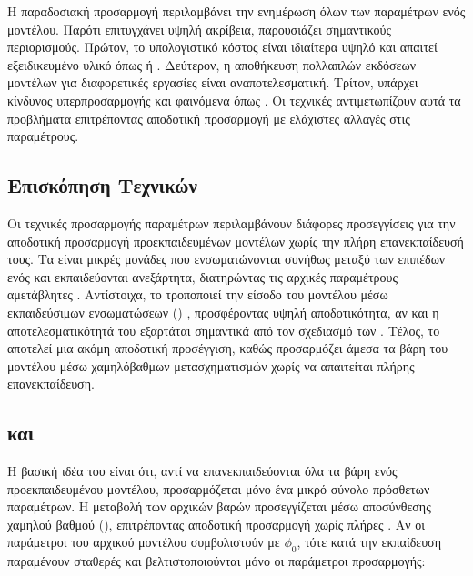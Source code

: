 Η παραδοσιακή προσαρμογή περιλαμβάνει την ενημέρωση όλων των παραμέτρων ενός μοντέλου. Παρότι επιτυγχάνει υψηλή ακρίβεια, παρουσιάζει σημαντικούς περιορισμούς. Πρώτον, το υπολογιστικό κόστος είναι ιδιαίτερα υψηλό και απαιτεί εξειδικευμένο υλικό όπως  ή . Δεύτερον, η αποθήκευση πολλαπλών εκδόσεων μοντέλων για διαφορετικές εργασίες είναι αναποτελεσματική. Τρίτον, υπάρχει κίνδυνος υπερπροσαρμογής και φαινόμενα όπως  \cite{raffel2020exploring}. Οι τεχνικές  αντιμετωπίζουν αυτά τα προβλήματα επιτρέποντας αποδοτική προσαρμογή με ελάχιστες αλλαγές στις παραμέτρους.

\subsection{Επισκόπηση Τεχνικών }

Οι τεχνικές προσαρμογής παραμέτρων περιλαμβάνουν διάφορες προσεγγίσεις για την αποδοτική προσαρμογή προεκπαιδευμένων μοντέλων χωρίς την πλήρη επανεκπαίδευσή τους. Τα  είναι μικρές μονάδες που ενσωματώνονται συνήθως μεταξύ των επιπέδων ενός  και εκπαιδεύονται ανεξάρτητα, διατηρώντας τις αρχικές παραμέτρους αμετάβλητες \cite{houlsby2019parameter}. Αντίστοιχα, το  τροποποιεί την είσοδο του μοντέλου μέσω εκπαιδεύσιμων ενσωματώσεων () \cite{lester2021power}, προσφέροντας υψηλή αποδοτικότητα, αν και η αποτελεσματικότητά του εξαρτάται σημαντικά από τον σχεδιασμό των . Τέλος, το  αποτελεί μια ακόμη αποδοτική προσέγγιση, καθώς προσαρμόζει άμεσα τα βάρη του μοντέλου μέσω χαμηλόβαθμων μετασχηματισμών χωρίς να απαιτείται πλήρης επανεκπαίδευση.

\subsection{ και }

Η βασική ιδέα του  είναι ότι, αντί να επανεκπαιδεύονται όλα τα βάρη ενός προεκπαιδευμένου μοντέλου, προσαρμόζεται μόνο ένα μικρό σύνολο πρόσθετων παραμέτρων. Η μεταβολή των αρχικών βαρών προσεγγίζεται μέσω αποσύνθεσης χαμηλού βαθμού (), επιτρέποντας αποδοτική προσαρμογή χωρίς πλήρες  \cite{hu2021lora}. Αν οι παράμετροι του αρχικού μοντέλου συμβολιστούν με \(\phi_0\), τότε κατά την εκπαίδευση παραμένουν σταθερές και βελτιστοποιούνται μόνο οι παράμετροι προσαρμογής:


